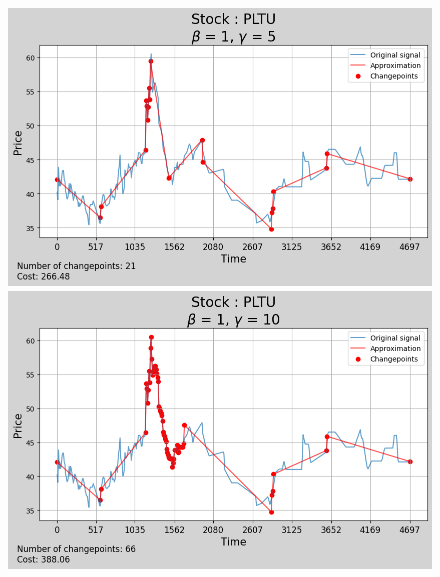 \documentclass[11pt]{article}
\begin{document}
\begin{figure}[H]
    \begin{minipage}[t]{0.42\textwidth}
        \includegraphics[width=\textwidth]{figures/results/scale_analysis_beta_1_stock_PLTU/scale_5.png}
    \end{minipage}
    \begin{minipage}[t]{0.42\textwidth}
        \includegraphics[width=\textwidth]{figures/results/scale_analysis_beta_1_stock_PLTU/scale_10.png}
    \end{minipage}


\end{figure}
\end{document}
